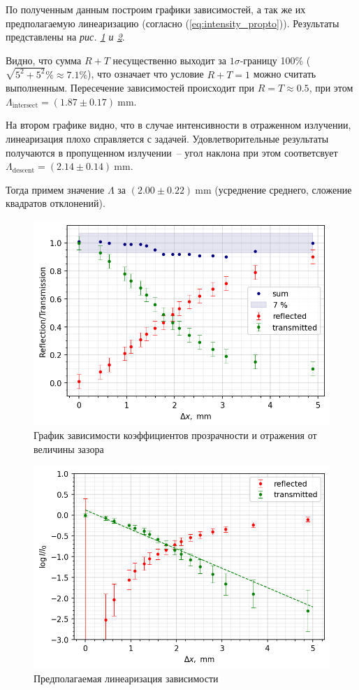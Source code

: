 \documentclass[12pt, a4paper]{article}
\newcommand{\mim}{~\mathrm{mm}}
\begin{document}
По полученным данным построим графики зависимостей, а так же их предполагаемую линеаризацию (согласно (\ref{eq:intensity_propto})).
Результаты представлены на \textit{рис. \ref{pic:res_lin} и \ref{pic:res_log}}.

Видно, что сумма $R+T$ несущественно выходит за $1\sigma$-границу 100\% ($\sqrt{5^2 + 5^2}\% \approx 7.1 \%$), что означает что условие 
$R+T = 1$ можно считать выполненным. Пересечение зависимостей происходит при $R=T\approx 0.5$, при этом 
$\Lambda_\text{intersect} = (1.87\pm0.17)\mim$.

На втором графике видно, что в случае интенсивности в отраженном излучении, линеаризация плохо справляется с задачей.
Удовлетворительные результаты получаются в пропущенном излучении~-- угол наклона при этом соответсвует 
$\Lambda_\text{descent} = (2.14\pm 0.14) \mim$.

Тогда примем значение $\Lambda$ за $(2.00 \pm 0.22)\mim$ (усреднение среднего, сложение квадратов отклонений).
\begin{figure}[H]
  \includegraphics[width=0.8\linewidth]{pics/results-1-linear.png}
  \caption{График зависимости коэффициентов прозрачности и отражения от величины зазора}
  \label{pic:res_lin}
\end{figure}
\begin{figure}[H]
  \includegraphics[width=0.8\linewidth]{pics/resluts-2-log.png}
  \caption{Предполагаемая линеаризация зависимости}
  \label{pic:res_log}
\end{figure}
\end{document}

